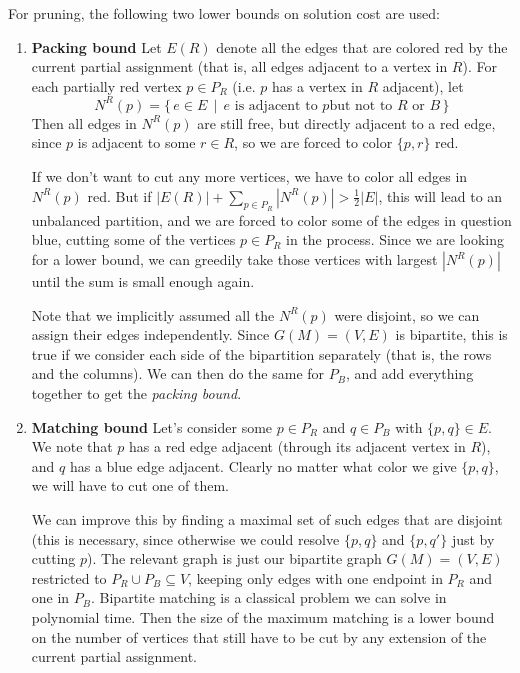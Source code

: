 	For pruning, the following two lower bounds on solution cost are used:
	\begin{enumerate}
		\item[] \textbf{Packing bound} Let $E(R)$ denote all the edges that
				are colored red by the current partial assignment (that is, all
				edges adjacent to a vertex in $R$).
				For each partially red vertex
				$p \in P_R$ (i.e. $p$ has a vertex in $R$ adjacent), let
				$$N^R(p) = \{\, e \in E \,\mid\, \text{$e$ is adjacent to $p$
				but not to $R$ or $B$}\,\}$$
				Then all edges in $N^R(p)$ are still free, but directly
				adjacent to a red edge, since $p$ is adjacent to some $r\in R$,
				so we are forced to color $\{p, r\}$ red.

				If we don't want to cut any more vertices, we have to color all
				edges in $N^R(p)$ red. But if
				$|E(R)| + \sum_{p\in P_R} |N^R(p)| > \frac{1}{2}|E|$, this will
				lead to an unbalanced partition, and we are forced to color
				some of the edges in question blue, cutting some
				of the vertices $p \in P_R$ in the process.
				Since we are looking for a lower
				bound, we can greedily take those vertices with largest
				$|N^R(p)|$ until the sum is small enough again.

				Note that we implicitly assumed all the $N^R(p)$ were disjoint,
				so we can assign their edges independently. Since
				$G(M) = (V,E)$ is bipartite, this is true if we consider each
				side of the bipartition separately (that is, the rows and the
				columns). We can then do the same
				for $P_B$, and add everything together to get the
				\textit{packing bound}.
		\item[] \textbf{Matching bound} Let's consider some $p \in P_R$ and
				$q \in P_B$ with $\{p, q\} \in E$. We note that $p$ has a red
				edge adjacent (through its adjacent vertex in $R$), and $q$ has
				a blue edge adjacent. Clearly no matter what color we give
				$\{p, q\}$, we will have to cut one of them.

				We can improve this by finding a maximal set of such edges that
				are disjoint (this is necessary, since otherwise we could
				resolve $\{p, q\}$ and $\{p, q'\}$ just by cutting $p$).
				The relevant graph is just our bipartite graph
				$G(M) = (V, E)$ restricted to
				$P_R \cup P_B \subseteq V$, keeping only edges with one
				endpoint in $P_R$ and one in $P_B$. Bipartite
				matching is a classical problem we can solve in polynomial
				time. Then the size of the maximum matching is a lower bound
				on the number of vertices that still have to be cut by any
				extension of the current partial assignment.
	\end{enumerate}


